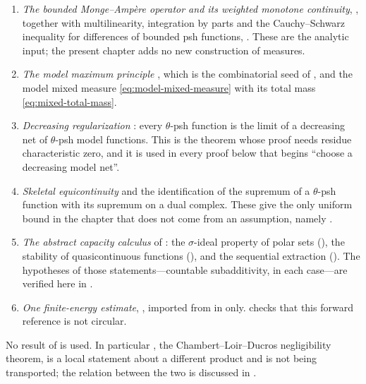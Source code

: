 \begin{enumerate}
\item\label{itm:ch25-import:ma}
 \emph{The bounded Monge--Amp\`ere operator and its weighted monotone
 continuity}, , together with
 multilinearity, integration by parts and the Cauchy--Schwarz inequality for
 differences of bounded psh functions,
 .  These are the analytic input; the
 present chapter adds no new construction of measures.
\item\label{itm:ch25-import:model}
 \emph{The model maximum principle} ,
 which is the combinatorial seed of
 , and the model mixed measure
 \eqref{eq:model-mixed-measure} with its total mass
 \eqref{eq:mixed-total-mass}.
\item\label{itm:ch25-import:reg}
 \emph{Decreasing regularization} :
 every \(\theta\)-psh function is the limit of a decreasing net of
 \(\theta\)-psh model functions.  This is the theorem whose proof needs
 residue characteristic zero, and it is used in every proof below that
 begins ``choose a decreasing model net''.
\item\label{itm:ch25-import:equi}
 \emph{Skeletal equicontinuity}  and
 the identification  of the supremum of a
 \(\theta\)-psh function with its supremum on a dual complex.  These give
 the only uniform bound in the chapter that does not come from an
 assumption, namely .
\item\label{itm:ch25-import:tools}
 \emph{The abstract capacity calculus} of : the
 \(\sigma\)-ideal property of polar sets
 (), the stability of quasicontinuous
 functions (), and the sequential
 extraction ().  The hypotheses of those
 statements---countable subadditivity, in each case---are verified here in
 .
\item\label{itm:ch25-import:e1}
 \emph{One finite-energy estimate}, , imported
 from  in  only.
  checks that this forward reference is not
 circular.
\end{enumerate}

No result of  is used.  In particular
, the Chambert--Loir--Ducros negligibility
theorem, is a local statement about a different product and is not being
transported; the relation between the two is discussed in
.

